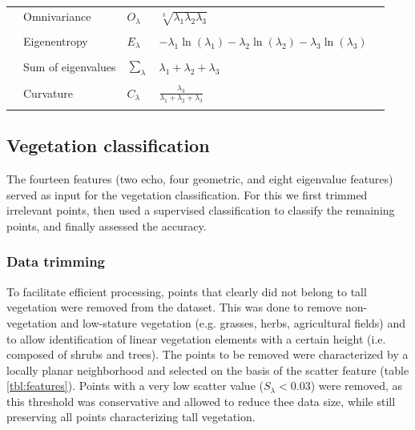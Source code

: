 \begin{table}[t]
\begin{tabular}{l l l l l}
		& Omnivariance & \(O_{\lambda}\) & \(\sqrt[3]{\lambda_{1} \lambda_{2} \lambda_{3}}\) & \citet{west2004context} \\ \\
		& Eigenentropy & \(E_{\lambda}\) & \(-\lambda_{1}\ln(\lambda_{1}) -\lambda_{2}\ln(\lambda_{2}) -\lambda_{3}\ln(\lambda_{3})\) & \citet{west2004context} \\ \\
		& Sum of eigenvalues & \(\sum_{\lambda}\) & \(\lambda_{1} + \lambda_{2} + \lambda_{3}\) & \cite{mallet2011relevance} \\ \\
		& Curvature & \(C_{\lambda}\) & \(\frac{\lambda_{3}}{\lambda_{1} + \lambda_{2} + \lambda_{3}}\) & \citet{pauly2002efficient} \\ \\
		\bottomrule
	\end{tabular}
\end{table}

\subsection{Vegetation classification}
The fourteen features (two echo, four geometric, and eight eigenvalue features) served as input for the vegetation classification. For this we first trimmed irrelevant points, then used a supervised classification to classify the remaining points, and finally assessed the accuracy.

\subsubsection{Data trimming}
To facilitate efficient processing, points that clearly did not belong to tall vegetation were removed from the dataset. This was done to remove non-vegetation and low-stature vegetation (e.g. grasses, herbs, agricultural fields) and to allow identification of linear vegetation elements with a certain height (i.e. composed of shrubs and trees). The points to be removed were characterized by a locally planar neighborhood and selected on the basis of the scatter feature (table \ref{tbl:features}). Points with a very low scatter value (\(S_{\lambda} < 0.03\)) were removed, as this threshold was conservative and allowed to reduce thee data size, while still preserving all points characterizing tall vegetation.

